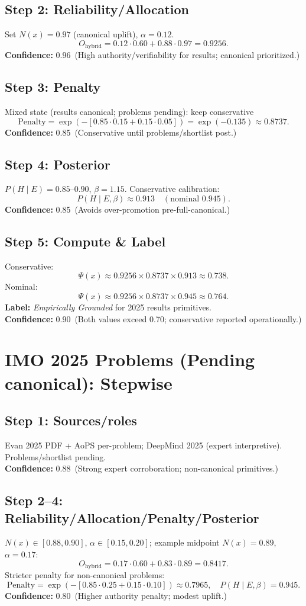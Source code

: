 \documentclass[11pt]{article}
\newcommand{\Nx}{N(x)}
\newcommand{\Px}{\Psi(x)}
\newcommand{\post}{P(H\mid E,\beta)}
\newcommand{\pen}{\mathrm{Penalty}}
\newcommand{\conf}[2]{\textbf{Confidence:} #1\ (#2)}
\begin{document}
\subsection*{Step 2: Reliability/Allocation}
Set $\Nx=0.97$ (canonical uplift), $\alpha=0.12$.
\[
O_{\text{hybrid}}=0.12\cdot 0.60 + 0.88\cdot 0.97 = 0.9256.
\]
\conf{0.96}{High authority/verifiability for results; canonical prioritized.}

\subsection*{Step 3: Penalty}
Mixed state (results canonical; problems pending): keep conservative
\[
\pen=\exp(-[0.85\cdot 0.15 + 0.15\cdot 0.05])=\exp(-0.135)\approx 0.8737.
\]
\conf{0.85}{Conservative until problems/shortlist post.}

\subsection*{Step 4: Posterior}
$P(H\mid E)=0.85$--$0.90$, $\beta=1.15$. Conservative calibration:
\[
\post \approx 0.913\quad(\text{nominal }0.945).
\]
\conf{0.85}{Avoids over-promotion pre-full-canonical.}

\subsection*{Step 5: Compute \& Label}
Conservative:
\[
\Px \approx 0.9256 \times 0.8737 \times 0.913 \approx 0.738.
\]
Nominal:
\[
\Px \approx 0.9256 \times 0.8737 \times 0.945 \approx 0.764.
\]
\textbf{Label:} \emph{Empirically Grounded} for 2025 results primitives.\\
\conf{0.90}{Both values exceed 0.70; conservative reported operationally.}

\section{IMO 2025 Problems (Pending canonical): Stepwise}
\subsection*{Step 1: Sources/roles}
Evan 2025 PDF + AoPS per-problem; DeepMind 2025 (expert interpretive). Problems/shortlist pending.\\
\conf{0.88}{Strong expert corroboration; non-canonical primitives.}

\subsection*{Step 2--4: Reliability/Allocation/Penalty/Posterior}
$\Nx\in[0.88,0.90]$, $\alpha\in[0.15,0.20]$; example midpoint $\Nx=0.89$, $\alpha=0.17$:
\[
O_{\text{hybrid}}=0.17\cdot 0.60 + 0.83\cdot 0.89=0.8417.
\]
Stricter penalty for non-canonical problems:
\[
\pen=\exp(-[0.85\cdot 0.25+0.15\cdot 0.10])\approx 0.7965,\quad \post=0.945.
\]
\conf{0.80}{Higher authority penalty; modest uplift.}
\end{document}
